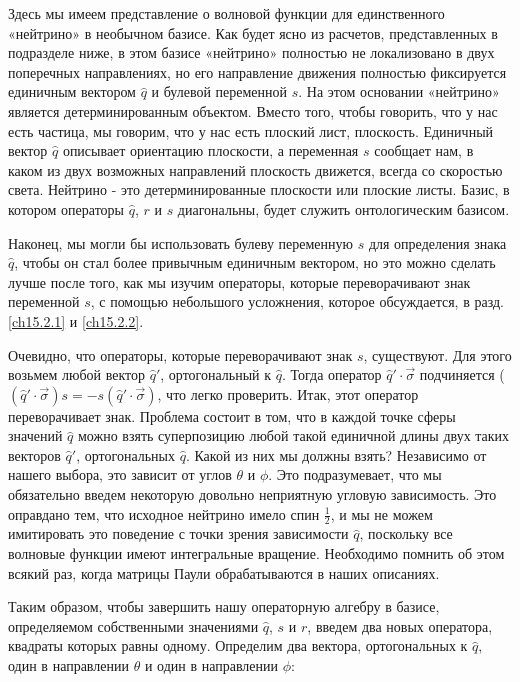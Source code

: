 \documentclass[main.tex]{subfiles}
\begin{document}
Здесь мы имеем представление о волновой функции для единственного «нейтрино» в необычном базисе. Как будет ясно из расчетов, представленных в подразделе ниже, в этом базисе «нейтрино» полностью не локализовано в двух поперечных направлениях, но его направление движения полностью фиксируется единичным вектором $\hat q$ и булевой переменной $s$. На этом основании «нейтрино» является детерминированным объектом. Вместо того, чтобы говорить, что у нас есть частица, мы говорим, что у нас есть плоский лист, плоскость. Единичный вектор $\hat q$ описывает ориентацию плоскости, а переменная $s$ сообщает нам, в каком из двух возможных направлений плоскость движется, всегда со скоростью света. Нейтрино - это детерминированные плоскости или плоские листы. Базис, в котором операторы $\hat q$, $r$ и $s$ диагональны, будет служить онтологическим базисом.

Наконец, мы могли бы использовать булеву переменную $s$ для определения знака $\hat q$, чтобы он стал более привычным единичным вектором, но это можно сделать лучше после того, как мы изучим операторы, которые переворачивают знак переменной $s$, с помощью небольшого усложнения, которое обсуждается, в разд. \ref{ch15.2.1} и \ref{ch15.2.2}.

Очевидно, что операторы, которые переворачивают знак $s$, существуют. Для этого возьмем любой вектор $\hat q'$, ортогональный к $\hat q$. Тогда оператор $\hat q'\cdot \vec\sigma$ подчиняется ($(\hat q'\cdot \vec\sigma) s = -s(\hat q'\cdot \vec\sigma)$, что легко проверить. Итак, этот оператор переворачивает знак. Проблема состоит в том, что в каждой точке сферы значений $\hat q$ можно взять суперпозицию любой такой единичной длины двух таких векторов $\hat q'$, ортогональных $\hat q$. Какой из них мы должны взять? Независимо от нашего выбора, это зависит от углов $\theta$ и $\phi$. Это подразумевает, что мы обязательно введем некоторую довольно неприятную угловую зависимость. Это оправдано тем, что исходное нейтрино имело спин $\frac 1 2$, и мы не можем имитировать это поведение с точки зрения зависимости $\hat q$, поскольку все волновые функции имеют интегральные вращение. Необходимо помнить об этом всякий раз, когда матрицы Паули обрабатываются в наших описаниях.

Таким образом, чтобы завершить нашу операторную алгебру в базисе, определяемом собственными значениями $\hat q$, $s$ и $r$, введем два новых оператора, квадраты которых равны одному. Определим два вектора, ортогональных к $\hat q$, один в направлении $\theta$ и один в направлении $\phi$:
\end{document}
